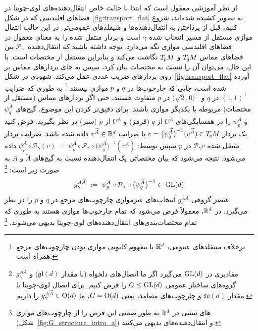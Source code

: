 از نظر آموزشی معقول است که ابتدا با حالت خاص انتقال‌دهنده‌های لوی-چویتا در فضاهای اقلیدسی که در شکل~\ref{fig:transport_flat} به تصویر کشیده شده‌اند، شروع کنیم، قبل از پرداختن به انتقال‌دهنده‌ها و منیفلدهای عمومی‌تر.
در این حالت انتقال موازی مستقل از مسیر انتخاب شده $\gamma$ است و بردار منتقل شده را به معنای معمول در فضاهای اقلیدسی موازی نگه می‌دارد.
توجه داشته باشید که انتقال‌دهنده~$\mathcal{P}_\gamma$ بین فضاهای مماس $T_{\mkern-1.5mu q}\mkern-.5muM$ و $T_{\mkern-1.5mu p}\mkern-.5muM$ نگاشت می‌کند و بنابراین مستقل از مختصات است.
با این حال، می‌توان آن را نسبت به مختصات بیان کرد، سپس به جای بردارهای مماس بر روی بردارهای ضریب عددی عمل می‌کند.
شهودی در شکل~\ref{fig:transport_flat} آورده شده است، جایی که چارچوب‌ها در $q$ و $p$ موازی نیستند%
\footnote{
	برخلاف منیفلدهای عمومی، $\mathbb{R}^d$ با مفهوم کانونی موازی بودن چارچوب‌های مرجع همراه است.
}
به طوری که ضرایب $(1,1)^\top$ در $q$ و $\big(\sqrt{2},0\big)^\top$ در $p$ متفاوت هستند، حتی اگر بردارهای مماس (مستقل از مختصات) مربوطه با یکدیگر موازی باشند.
برای دقیق‌تر کردن این موضوع، گیج‌های $\psi_q^{\widetilde{A}}$ و $\psi_p^A$ را در همسایگی‌های $U^{\widetilde{A}}$ از $q$ (قرمز) و $U^A$ از $p$ (سبز) در نظر بگیرید.
فرض کنید یک بردار $v = \big( \psi_q^{\widetilde{A}} \big)^{-1} (v^{\widetilde{A}}) \in T_{\mkern-1.5mu q}\mkern-.5muM$ با ضرایب $v^{\widetilde{A}} \in \mathbb{R}^d$ داده شده باشد.
ضرایب بردار منتقل شده $\mathcal{P}_\gamma v$ در $p$ سپس توسط:
$
\psi_p^A \circ \mathcal{P}_\gamma (v)
\ =\ \psi_p^A \circ \mathcal{P}_\gamma \circ \big(\psi_q^{\widetilde{A}}\big)^{-1} (v^{\widetilde{A}})
$
داده می‌شود.
نتیجه می‌شود که بیان مختصاتی یک انتقال‌دهنده نسبت به گیج‌های $\widetilde{A}$ و $A$ به صورت زیر است:%
\footnote{
	$g_\gamma^{A\widetilde{A}}$ مقادیری در $\operatorname{GL}(d)$ می‌گیرد اگر ما اتصال‌های دلخواه (با مقدار $\mathfrak{gl}(d)$) و گروه‌های ساختار عمومی $G \leq \operatorname{GL}(d)$ را فرض کنیم.
	برای اتصال لوی-چویتا با مقدار $\mathfrak{so}(d)$ و چارچوب‌های متعامد، یعنی $G=\operatorname{O}(d)$، ما $g_\gamma^{A\widetilde{A}} \in \operatorname{O}(d)$ را داریم.
}
\begin{align}\label{eq:transporter_gauge}
	g_\gamma^{A\widetilde{A}} \ :=\ \psi_p^A \circ \mathcal{P}_\gamma \circ \big( \psi_q^{\widetilde{A}} \mkern1mu\big)^{-1} \in\, \operatorname{GL}(d)
\end{align}
عنصر گروهی $g_\gamma^{A\widetilde{A}}$ انتخاب‌های غیرموازی چارچوب‌های مرجع در $q$ و $p$ را در نظر می‌گیرد.
در $\mathbb{R}^d$، معمولاً فرض می‌شود که تمام چارچوب‌ها موازی هستند به طوری که تمام مختصات‌بندی‌های انتقال‌دهنده‌های لوی-چویتا بدیهی می‌شوند.%
\footnote{
	\CNN{}های سنتی در $\mathbb{R}^d$ به طور ضمنی این فرض را از چارچوب‌های موازی (شکل~\ref{fig:G_structure_intro_a}) و انتقال‌دهنده‌های بدیهی می‌کنند.
}

